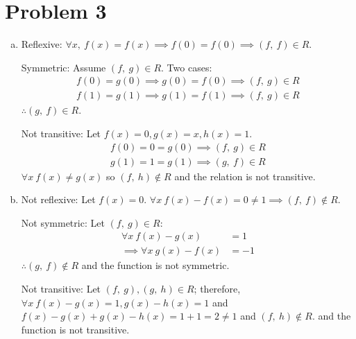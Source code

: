 \documentclass[11pt]{article}
\begin{document}
\section*{Problem 3}
	\begin{enumerate}[(a)]
	
	\item
		Reflexive: $\forall x,\ f(x) = f(x) \implies f(0) = f(0) \implies (f,\ 
		f) \in R$.
		
		Symmetric: Assume $(f,\ g) \in R$. Two cases:
		\begin{align*}
		f(0) = g(0) \implies g(0) = f(0) \implies (f,\ g) \in R\\
		f(1) = g(1) \implies g(1) = f(1) \implies (f,\ g) \in R
		\end{align*}
		$\therefore (g,\ f) \in R$.
		
		Not transitive: Let $f(x) = 0, g(x) = x, h(x) = 1$.
		\begin{align*}
		f(0) = 0 = g(0) \implies (f,\ g) \in R\\
		g(1) = 1 = g(1) \implies (g,\ f) \in R
		\end{align*}
		$\forall x\ f(x) \neq g(x)$ so $(f,\ h) \not\in R$ and the relation is 
		not transitive.
		
	\item
		Not reflexive: Let $f(x) = 0$. $\forall x\ f(x) -f(x) = 0 \neq 1 
		\implies (f,\ f) \not\in R$.
		
		Not symmetric: Let $(f,\ g) \in R$:
		\begin{align*}
		\forall x\ f(x)-g(x) &= 1\\
		\implies \forall x\ g(x)-f(x) &= -1
		\end{align*}
		$\therefore (g,\ f) \not\in R$ and the function is not symmetric.
		
		Not transitive: Let $(f,\ g), (g,\ h) \in R$; therefore, $\forall x\ 
		f(x) -g(x) =1, g(x) -h(x) = 1$ and $f(x) -g(x) + g(x) -h(x) = 1 + 1 = 2 
		\neq 1$ and $(f,\ h) \not\in R.$ and the function is not transitive.
		
	\end{enumerate}
\end{document}

